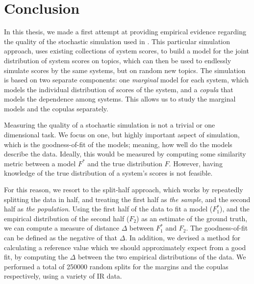\chapter{Conclusion}\label{ch:5}

In this thesis, we made a first attempt at providing empirical evidence regarding the quality of the stochastic simulation used in \cite{Urbano2019}. This particular simulation approach, uses existing collections of system scores, to build a model for the joint distribution of system scores on topics, which can then be used to endlessly simulate scores by the same systems, but on random new topics. The simulation is based on two separate components: one \textit{marginal} model for each system, which models the individual distribution of scores of the system, and a \textit{copula} that models the dependence among systems. This allows us to study the marginal models and the copulas separately. 

Measuring the quality of a stochastic simulation is not a trivial or one dimensional task. We focus on one, but highly important aspect of simulation, which is the goodness-of-fit of the models; meaning, how well do the models describe the data. Ideally, this would be measured by computing some similarity metric between a model $F^*$ and the true distribution $F$. However, having knowledge of the true distribution of a system's scores is not feasible. 

For this reason, we resort to the split-half approach, which works by repeatedly splitting the data in half, and treating the first half as \textit{the sample}, and the second half as \textit{the population}. Using the first half of the data to fit a model ($F_1^*$), and the empirical distribution of the second half ($F_2$) as an estimate of the ground truth, we can compute a measure of distance $\Delta$ between $F_1^*$ and $F_2$. The goodness-of-fit can be defined as the negative of that $\Delta$. In addition, we devised a method for calculating a reference value which we should approximately expect from a good fit, by computing the $\Delta$ between the two empirical distributions of the data. We performed a total of \num{250000} random splits for the margins and the copulas respectively, using a variety of IR data.

